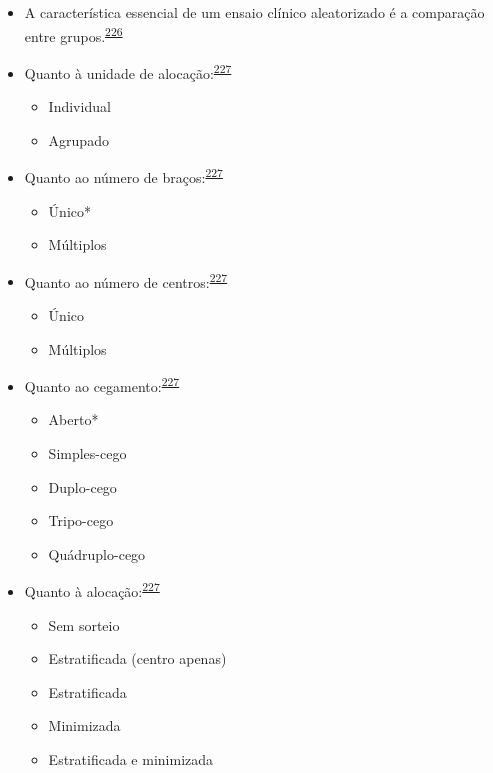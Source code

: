 \documentclass[
  a4paper,
]{book}
\begin{document}
\begin{itemize}
\item
  A característica essencial de um ensaio clínico aleatorizado é a comparação entre grupos.\textsuperscript{\protect\hyperlink{ref-bland2011}{226}}
\item
  Quanto à unidade de alocação:\textsuperscript{\protect\hyperlink{ref-Bruce2022}{227}}

  \begin{itemize}
  \item
    Individual
  \item
    Agrupado
  \end{itemize}
\item
  Quanto ao número de braços:\textsuperscript{\protect\hyperlink{ref-Bruce2022}{227}}

  \begin{itemize}
  \item
    Único*
  \item
    Múltiplos
  \end{itemize}
\item
  Quanto ao número de centros:\textsuperscript{\protect\hyperlink{ref-Bruce2022}{227}}

  \begin{itemize}
  \item
    Único
  \item
    Múltiplos
  \end{itemize}
\item
  Quanto ao cegamento:\textsuperscript{\protect\hyperlink{ref-Bruce2022}{227}}

  \begin{itemize}
  \item
    Aberto*
  \item
    Simples-cego
  \item
    Duplo-cego
  \item
    Tripo-cego
  \item
    Quádruplo-cego
  \end{itemize}
\item
  Quanto à alocação:\textsuperscript{\protect\hyperlink{ref-Bruce2022}{227}}

  \begin{itemize}
  \item
    Sem sorteio
  \item
    Estratificada (centro apenas)
  \item
    Estratificada
  \item
    Minimizada
  \item
    Estratificada e minimizada
  \end{itemize}
\end{itemize}
\end{document}
